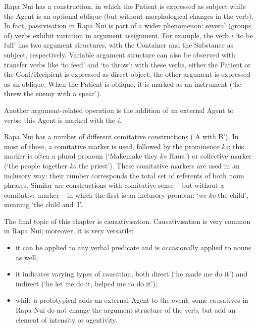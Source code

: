 Rapa Nui has a  construction, in which the Patient is expressed as subject while the Agent is an optional oblique (but without morphological changes in the verb). In fact, passivisation in Rapa Nui is part of a wider phenomenon: several (groups of) verbs exhibit variation in argument assignment. For example, the verb \textit{{\ꞌ}ī} ‘to be full’ has two argument structures, with the Container and the Substance as subject, respectively. Variable argument structure can also be observed with transfer verbs like ‘to feed’ and ‘to throw’: with these verbs, either the Patient or the Goal/Recipient is expressed as direct object; the other argument is expressed as an oblique. When the Patient is oblique, it is marked as an instrument (‘he threw the enemy with a spear’). 

Another argument-related operation is the addition of an external Agent to  verbs; this Agent is marked with the  \textit{i}.

Rapa Nui has a number of different comitative constructions (‘A with B’). In most of these, a comitative marker is used, followed by the prominence \textit{ko}; this marker is often a plural pronoun (‘Makemake they \textit{ko} Haua’) or collective marker (‘the people together \textit{ko} the priest’). These comitative markers are used in an inclusory way: their number corresponds the total set of referents of both noun phrases. Similar are constructions with comitative sense – but without a comitative marker – in which the first  is an inclusory pronoun: ‘we \textit{ko} the child’, meaning ‘the child and~I’.

The final topic of this chapter is causativisation. Causativisation is very common in Rapa Nui; moreover, it is very versatile: 

\begin{itemize}
\item 
it can be applied to any verbal predicate and is occasionally applied to nouns as well; 

\item 
it indicates varying types of causation, both direct (‘he made me do it’) and indirect (‘he let me do it, helped me to do it’);

\item 
while a prototypical  adds an external Agent to the event, some causatives in Rapa Nui do not change the argument structure of the verb, but add an element of intensity or agentivity.

\end{itemize}
